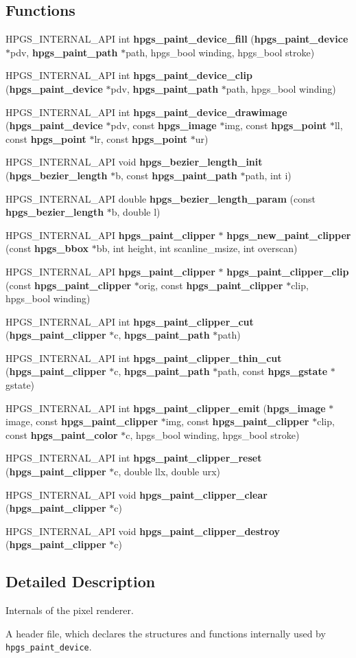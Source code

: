 \subsection*{Functions}
\begin{CompactItemize}
\item 
HPGS\_\-INTERNAL\_\-API int {\bf hpgs\_\-paint\_\-device\_\-fill} ({\bf hpgs\_\-paint\_\-device} $\ast$pdv, {\bf hpgs\_\-paint\_\-path} $\ast$path, hpgs\_\-bool winding, hpgs\_\-bool stroke)
\item 
HPGS\_\-INTERNAL\_\-API int {\bf hpgs\_\-paint\_\-device\_\-clip} ({\bf hpgs\_\-paint\_\-device} $\ast$pdv, {\bf hpgs\_\-paint\_\-path} $\ast$path, hpgs\_\-bool winding)
\item 
HPGS\_\-INTERNAL\_\-API int {\bf hpgs\_\-paint\_\-device\_\-drawimage} ({\bf hpgs\_\-paint\_\-device} $\ast$pdv, const {\bf hpgs\_\-image} $\ast$img, const {\bf hpgs\_\-point} $\ast$ll, const {\bf hpgs\_\-point} $\ast$lr, const {\bf hpgs\_\-point} $\ast$ur)
\item 
HPGS\_\-INTERNAL\_\-API void {\bf hpgs\_\-bezier\_\-length\_\-init} ({\bf hpgs\_\-bezier\_\-length} $\ast$b, const {\bf hpgs\_\-paint\_\-path} $\ast$path, int i)
\item 
HPGS\_\-INTERNAL\_\-API double {\bf hpgs\_\-bezier\_\-length\_\-param} (const {\bf hpgs\_\-bezier\_\-length} $\ast$b, double l)
\item 
HPGS\_\-INTERNAL\_\-API {\bf hpgs\_\-paint\_\-clipper} $\ast$ {\bf hpgs\_\-new\_\-paint\_\-clipper} (const {\bf hpgs\_\-bbox} $\ast$bb, int height, int scanline\_\-msize, int overscan)
\item 
HPGS\_\-INTERNAL\_\-API {\bf hpgs\_\-paint\_\-clipper} $\ast$ {\bf hpgs\_\-paint\_\-clipper\_\-clip} (const {\bf hpgs\_\-paint\_\-clipper} $\ast$orig, const {\bf hpgs\_\-paint\_\-clipper} $\ast$clip, hpgs\_\-bool winding)
\item 
HPGS\_\-INTERNAL\_\-API int {\bf hpgs\_\-paint\_\-clipper\_\-cut} ({\bf hpgs\_\-paint\_\-clipper} $\ast$c, {\bf hpgs\_\-paint\_\-path} $\ast$path)
\item 
HPGS\_\-INTERNAL\_\-API int {\bf hpgs\_\-paint\_\-clipper\_\-thin\_\-cut} ({\bf hpgs\_\-paint\_\-clipper} $\ast$c, {\bf hpgs\_\-paint\_\-path} $\ast$path, const {\bf hpgs\_\-gstate} $\ast$gstate)
\item 
HPGS\_\-INTERNAL\_\-API int {\bf hpgs\_\-paint\_\-clipper\_\-emit} ({\bf hpgs\_\-image} $\ast$image, const {\bf hpgs\_\-paint\_\-clipper} $\ast$img, const {\bf hpgs\_\-paint\_\-clipper} $\ast$clip, const {\bf hpgs\_\-paint\_\-color} $\ast$c, hpgs\_\-bool winding, hpgs\_\-bool stroke)
\item 
HPGS\_\-INTERNAL\_\-API int {\bf hpgs\_\-paint\_\-clipper\_\-reset} ({\bf hpgs\_\-paint\_\-clipper} $\ast$c, double llx, double urx)
\item 
HPGS\_\-INTERNAL\_\-API void {\bf hpgs\_\-paint\_\-clipper\_\-clear} ({\bf hpgs\_\-paint\_\-clipper} $\ast$c)
\item 
HPGS\_\-INTERNAL\_\-API void {\bf hpgs\_\-paint\_\-clipper\_\-destroy} ({\bf hpgs\_\-paint\_\-clipper} $\ast$c)
\end{CompactItemize}


\subsection{Detailed Description}
Internals of the pixel renderer. 

A header file, which declares the structures and functions internally used by {\tt hpgs\_\-paint\_\-device}. 